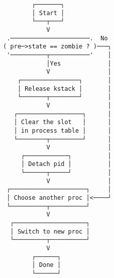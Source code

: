 \documentclass[varwidth,crop]{standalone}
\begin{document}
\begin{verbatim}
        ┌───────┐
        │ Start │
        └───┬───┘
            V
 .──────────────────────.  No
( pre─>state == zombie ? )───┐
 '──────────┬───────────'    │
            │Yes             │
            V                │
    ┌────────────────┐       │
    │ Release kstack │       │
    └───────┬────────┘       │
            V                │
   ┌──────────────────┐      │
   │ Clear the slot   │      │
   │ in process table │      │
   └────────┬─────────┘      │
            V                │
     ┌────────────┐          │
     │ Detach pid │          │
     └──────┬─────┘          │
            V                │
 ┌─────────────────────┐     │
 │ Choose another proc │<────┘
 └──────────┬──────────┘
            V
  ┌────────────────────┐
  │ Switch to new proc │
  └─────────┬──────────┘
            V
        ┌──────┐
        │ Done │
        └──────┘
\end{verbatim}
\end{document}
